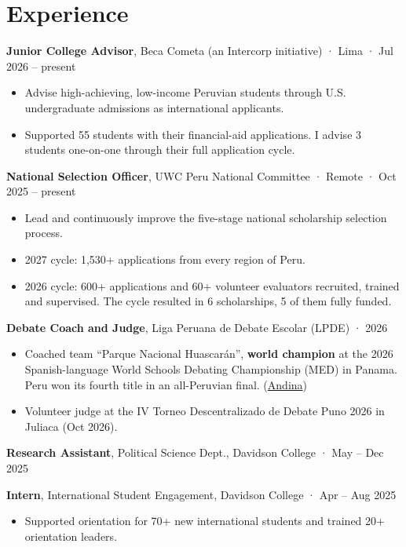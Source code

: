 \documentclass[10pt,a4paper]{article}
\begin{document}
\section*{Experience}
\smallskip
\textbf{Junior College Advisor}, Beca Cometa (an Intercorp initiative) · Lima · Jul 2026 – present\par
\begin{itemize}
\item Advise high-achieving, low-income Peruvian students through U.S. undergraduate admissions as international applicants.
\item Supported 55 students with their financial-aid applications. I advise 3 students one-on-one through their full application cycle.
\end{itemize}
\smallskip
\textbf{National Selection Officer}, UWC Peru National Committee · Remote · Oct 2025 – present\par
\begin{itemize}
\item Lead and continuously improve the five-stage national scholarship selection process.
\item 2027 cycle: 1,530+ applications from every region of Peru.
\item 2026 cycle: 600+ applications and 60+ volunteer evaluators recruited, trained and supervised. The cycle resulted in 6 scholarships, 5 of them fully funded.
\end{itemize}
\smallskip
\textbf{Debate Coach and Judge}, Liga Peruana de Debate Escolar (LPDE) · 2026\par
\begin{itemize}
\item Coached team ``Parque Nacional Huascarán'', \textbf{world champion} at the 2026 Spanish-language World Schools Debating Championship (MED) in Panama. Peru won its fourth title in an all-Peruvian final. (\href{https://andina.pe/agencia/noticia-peru-se-corona-tetracampeon-el-mundial-debate-escolar-espanol-2026-1091241.aspx}{Andina})
\item Volunteer judge at the IV Torneo Descentralizado de Debate Puno 2026 in Juliaca (Oct 2026).
\end{itemize}
\smallskip
\textbf{Research Assistant}, Political Science Dept., Davidson College · May – Dec 2025\par
\smallskip
\textbf{Intern}, International Student Engagement, Davidson College · Apr – Aug 2025\par
\begin{itemize}
\item Supported orientation for 70+ new international students and trained 20+ orientation leaders.
\end{itemize}
\end{document}
